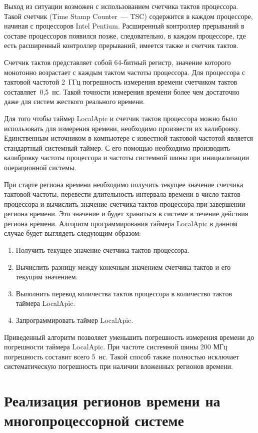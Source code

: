 \begin{multicols}{2}
   Выход из ситуации возможен с использованием счетчика тактов процессора. Такой счетчик
(Time Stamp Counter~--- TSC) содержится в каждом процессоре, начиная с процессоров Intel
Pentium. Расширенный контроллер прерываний в составе процессоров появился позже,
следовательно, в каждом процессоре, где есть расширенный контроллер прерываний, имеется
также и счетчик тактов.

   Счетчик тактов представляет собой 64-битный регистр, значение которого монотонно
возрастает с каждым тактом частоты процессора. Для процессора с тактовой частотой 2~ГГц
погрешность измерения времени счетчиком тактов составляет~0,5~нс. Такой точности измерения
времени более чем достаточно даже для систем жесткого реального времени.

   Для того чтобы таймер LocalApic и счетчик тактов процессора можно было использовать для
измерения времени, необходимо произвести их ка\-либ\-ров\-ку. Единственным источником в
компьютере с известной тактовой частотой является стандартный системный таймер. С его
помощью необходимо производить калибровку частоты процессора и частоты системной шины
при инициализации операционной системы.

   При старте региона времени необходимо получить текущее значение счетчика тактовой
частоты, перевести длительность интервала времени в число тактов процессора и вычислить
значение счетчика тактов процессора при завершении региона времени. Это значение и будет
храниться в системе в течение действия региона времени. Алгоритм программирования таймера
LocalApic в данном случае будет выглядеть следующим образом:
   \begin{enumerate}[1.]
\item Получить текущее значение счетчика тактов процессора.
\item Вычислить разницу между конечным значением счетчика тактов и его текущим
значением.
\item Выполнить перевод количества тактов процессора в количество тактов таймера
LocalApic.
\item Запрограммировать таймер LocalApic.
   \end{enumerate}

Приведенный алгоритм позволяет уменьшить погрешность измерения времени до погрешности
таймера LocalApic. При частоте системной шины 200 МГц погрешность составит всего 5~нс.
Такой способ также полностью исключает систематическую погрешность при наличии вложенных
регионов времени.

\section{Реализация регионов времени на многопроцессорной системе}


\end{multicols}
